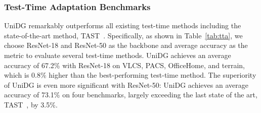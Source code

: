 \documentclass{article} \usepackage{iclr2024_conference,times}
\def\Model{UniDG }
\begin{document}
\subsubsection{Test-Time Adaptation Benchmarks} \label{sec:exp:main_results:tta}
\Model remarkably outperforms all existing test-time methods including the state-of-the-art method, TAST~\citep{jang2022test}. Specifically, as shown in Table~\ref{tab:tta}, we choose ResNet-18 and ResNet-50 as the backbone and average accuracy as the metric to evaluate several test-time methods. \Model achieves an average accuracy of 67.2\% with ResNet-18 on VLCS, PACS, OfficeHome, and terrain, which is 0.8\% higher than the best-performing test-time method. The superiority of \Model is even more significant with ResNet-50: \Model achieves an average accuracy of 73.1\% on four benchmarks, largely exceeding the last state of the art, TAST~\citep{jang2022test}, by 3.5\%.
\end{document}

